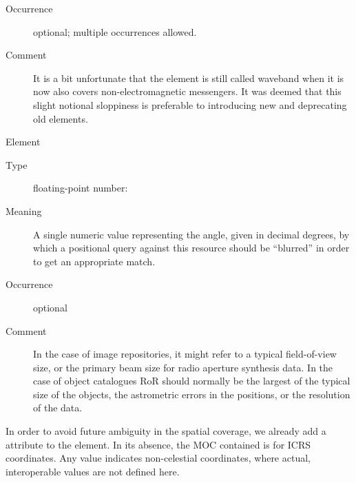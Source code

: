 \documentclass[11pt,a4paper]{ivoa}
\begin{document}
\begin{generated}
\begin{bigdescription}
\begin{description}
\item[Occurrence] optional; multiple occurrences allowed.
\item[Comment] 
                  It is a bit unfortunate that the element is still called
                  waveband when it is now also covers non-electromagnetic
                  messengers.  It was deemed that this slight notional
                  sloppiness is preferable to introducing new and
                  deprecating old elements.
               

\end{description}
\item[Element \xmlel{regionOfRegard}]
\begin{description}
\item[Type] floating-point number: 
\item[Meaning] 
                  A single numeric value representing the angle, given
                  in decimal degrees, by which a positional query
                  against this resource should be “blurred” in order
                  to get an appropriate match. 
               
\item[Occurrence] optional
\item[Comment] 
                  In the case of image repositories, it might refer to
                  a typical field-of-view size, or the primary beam
                  size for radio aperture synthesis data.  In the case
                  of object catalogues RoR should normally be the
                  largest of the typical size of the objects, the
                  astrometric errors in the positions, or the
                  resolution of the data.  
               

\end{description}


\end{bigdescription}\endgroup

\endgroup
\end{generated}


In order to avoid future ambiguity in the spatial coverage, we already
add a  attribute to the  element.  In its
absence, the MOC contained is for ICRS coordinates.  Any value indicates
non-celestial coordinates, where actual, interoperable values are not
defined here.
\end{document}
